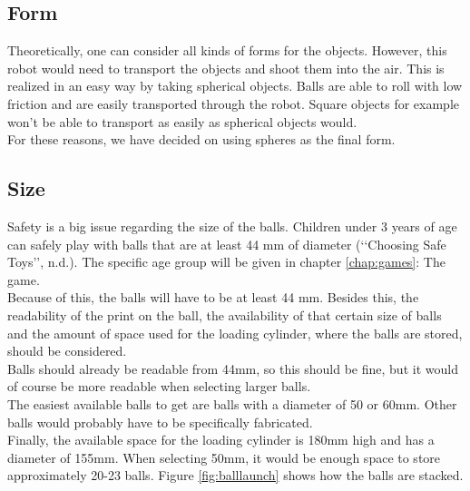 \documentclass[11pt,twoside,a4paper]{report}
\begin{document}
\subsection*{Form}
Theoretically, one can consider all kinds of forms for the objects. However, this robot would need to transport the objects and shoot them into the air. This is realized in an easy way by taking spherical objects. Balls are able to roll with low friction and are easily transported through the robot. Square objects for example won\rq{}t be able to transport as easily as spherical objects would. \\
For these reasons, we have decided on using spheres as the final form.
\subsection*{Size}
Safety is a big issue regarding the size of the balls. Children under 3 years of age can safely play with balls that are at least 44 mm of diameter (\lq\lq{}Choosing Safe Toys\rq\rq{}, n.d.). The specific age group will be given in chapter \ref{chap:games}: The game. \\
Because of this, the balls will have to be at least 44 mm. Besides this, the readability of the print on the ball, the availability of that certain size of balls and the amount of space used for the loading cylinder, where the balls are stored, should be considered. \\
Balls should already be readable from 44mm, so this should be fine, but it would of course be more readable when selecting larger balls. \\
The easiest available balls to get are balls with a diameter of 50 or 60mm. Other balls would probably have to be specifically fabricated. \\
Finally, the available space for the loading cylinder is 180mm high and has a diameter of 155mm. When selecting 50mm, it would be enough space to store approximately 20-23 balls. Figure \ref{fig:balllaunch} shows how the balls are stacked. \\
\end{document}
